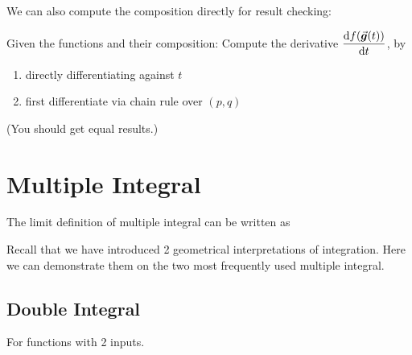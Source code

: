 \documentclass[class=article, crop=false, 12pt]{standalone}
\begin{document}
We can also compute the composition directly for result checking:

\begin{exercise}
    Given the functions and their composition: 
    Compute the derivative $\dvv{f(\vvec{g}(t))}{t}$, by
    \begin{enumerate}
        \item directly differentiating against $t$
        \item first differentiate via chain rule over $(p,q)$
    \end{enumerate}
    (You should get equal results.)
\end{exercise}



\linesep
\section{Multiple Integral}

The limit definition of multiple integral can be written as


Recall that we have introduced 2 geometrical interpretations of integration.
Here we can demonstrate them on the two most frequently used multiple integral.

\subsection{Double Integral}

For functions with 2 inputs.\\
\end{document}
